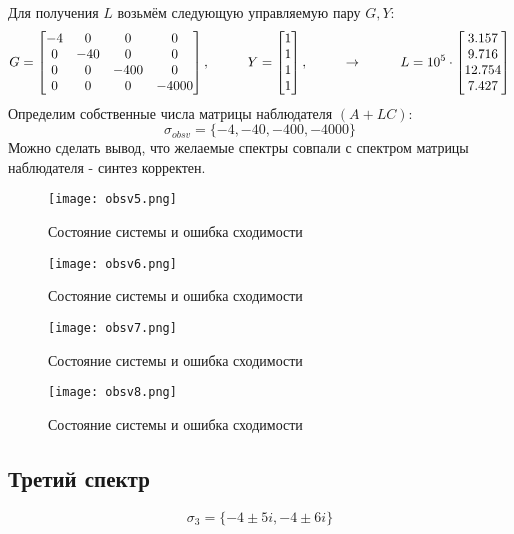 Для получения $L$ возьмём следующую управляемую пару $G,Y$:
$$
G = \begin{bmatrix}
  -4  &   0  &   0  &   0 \\
  0  &  -40   &  0   &  0 \\
  0  &   0  &  -400  &   0 \\
  0   &  0   &  0  &  -4000
\end{bmatrix}, \hspace*{1cm} Y = \begin{bmatrix} 1\\1\\1\\1 \end{bmatrix},\hspace*{1cm} \rightarrow \hspace*{1cm}
L = 10^5\cdot\begin{bmatrix}
  3.157\\9.716\\12.754\\7.427
    \end{bmatrix}
$$
Определим собственные числа матрицы наблюдателя $(A+LC)$:
$$
    \sigma_{obsv}=\{-4, -40, -400, -4000 \}
$$
Можно сделать вывод, что желаемые спектры совпали с спектром матрицы наблюдателя - синтез корректен.
\begin{figure}[ht]
  \centering
  \texttt{[image: obsv5.png]}
  \caption{Состояние системы и ошибка сходимости}
\end{figure}
\newpage
\begin{figure}[ht]
  \centering
  \texttt{[image: obsv6.png]}
  \caption{Состояние системы и ошибка сходимости}
\end{figure}
\begin{figure}[ht]
  \centering
  \texttt{[image: obsv7.png]}
  \caption{Состояние системы и ошибка сходимости}
\end{figure}
\newpage
\begin{figure}[ht]
  \centering
  \texttt{[image: obsv8.png]}
  \caption{Состояние системы и ошибка сходимости}
\end{figure}


\newpage
\subsection{Третий спектр}
$$
  \sigma_3 = \{-4 \pm 5i, -4 \pm 6i\} 
$$


